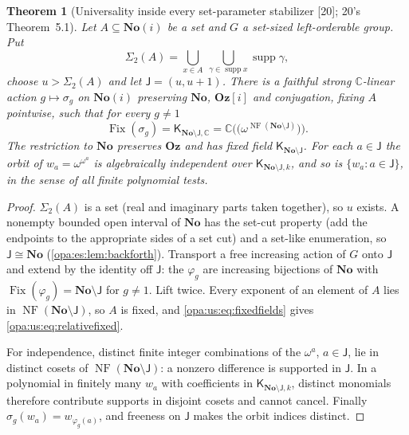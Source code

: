 \documentclass[11pt,oneside]{article}
\numberwithin{equation}{section}
\newtheorem{theorem}{Theorem}[section]
\theoremstyle{definition}
\theoremstyle{remark}
\newcommand{\No}{\mathbf{No}}
\newcommand{\Oz}{\mathbf{Oz}}
\newcommand{\Og}{\mathbf{Oz}[i]}
\newcommand{\SC}{\mathbf{No}(i)}
\newcommand{\C}{\mathbb C}
\newcommand{\supp}{\operatorname{supp}}
\newcommand{\Fix}{\operatorname{Fix}}
\newcommand{\src}[1]{\textup{\textsf{\small[#1]}}}
\newcommand{\NF}{\operatorname{NF}}
\begin{document}
\begin{theorem}[Universality inside every set-parameter stabilizer \src{20}; 20's Theorem~5.1]\label{opa:us:thm:relative}
Let $A\subseteq\SC$ be a set and $G$ a set-sized left-orderable group. Put
\begin{equation}\label{opa:us:eq:secondsupport}
 \Sigma_2(A)=\bigcup_{x\in A}\ \bigcup_{\gamma\in\supp x}\supp\gamma ,
\end{equation}
choose $u>\Sigma_2(A)$ and let $\mathsf J=(u,u+1)$. There is a faithful strong $\C$-linear action $g\mapsto\sigma_g$ on $\SC$ preserving
$\No$, $\Og$ and conjugation, fixing $A$ pointwise, such that for every $g\ne1$
\begin{equation}\label{opa:us:eq:relativefixed}
 \Fix(\sigma_g)=\mathsf K_{\No\setminus\mathsf J,\C}=\C\bigl(\bigl(\omega^{\NF(\No\setminus\mathsf J)}\bigr)\bigr).
\end{equation}
The restriction to $\No$ preserves $\Oz$ and has fixed field $\mathsf K_{\No\setminus\mathsf J}$. For each $a\in\mathsf J$ the orbit of
$w_a=\omega^{\omega^a}$ is algebraically independent over $\mathsf K_{\No\setminus\mathsf J,k}$, and so is $\{w_a:a\in\mathsf J\}$, in the sense of all
finite polynomial tests.
\end{theorem}
\begin{proof}
$\Sigma_2(A)$ is a set (real and imaginary parts taken together), so $u$ exists. A nonempty bounded open interval of $\No$ has the set-cut
property (add the endpoints to the appropriate sides of a set cut) and a set-like enumeration, so $\mathsf J\cong\No$
(\cref{opa:es:lem:backforth}). Transport a free increasing action of $G$ onto $\mathsf J$ and extend by the identity off $\mathsf J$: the
$\varphi_g$ are increasing bijections of $\No$ with $\Fix(\varphi_g)=\No\setminus\mathsf J$ for $g\ne1$. Lift twice. Every exponent of an element of $A$
lies in $\NF(\No\setminus\mathsf J)$, so $A$ is fixed, and \eqref{opa:us:eq:fixedfields} gives \eqref{opa:us:eq:relativefixed}.

For independence, distinct finite integer combinations of the $\omega^a$, $a\in\mathsf J$, lie in distinct cosets of $\NF(\No\setminus\mathsf J)$: a
nonzero difference is supported in $\mathsf J$. In a polynomial in finitely many $w_a$ with coefficients in $\mathsf K_{\No\setminus\mathsf J,k}$, distinct
monomials therefore contribute supports in disjoint cosets and cannot cancel. Finally $\sigma_g(w_a)=w_{\varphi_g(a)}$, and freeness on $\mathsf J$
makes the orbit indices distinct.
\end{proof}
\end{document}
